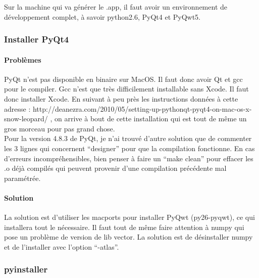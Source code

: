 \documentclass[12pt,a4paper]{article}
\begin{document}
        Sur la machine qui va g\'en\'erer le .app, il faut avoir un
        environnement de d\'eveloppement complet, à savoir python2.6, PyQt4 et
        PyQwt5.

        \subsubsection{Installer PyQt4}

        \paragraph{Problèmes}

        PyQt n'est pas disponible en binaire sur MacOS. Il faut donc avoir Qt et
        gcc pour le compiler.  Gcc n'est que très difficilement installable sans
        Xcode. Il faut donc installer Xcode.  En suivant à peu près les
        instructions données à cette adresse : \newline
        http://deanezra.com/2010/05/setting-up-pythonqt-pyqt4-on-mac-os-x-snow-leopard/\newline
        , on arrive à bout de cette installation qui est tout de même un gros
        morceau pour pas grand chose.\\
    
        Pour la version 4.8.3 de PyQt, je n'ai trouvé d'autre solution que de
        commenter les 3 lignes qui concernent ``designer'' pour que la
        compilation fonctionne. En cas d'erreurs incompréhensibles, bien penser
        à faire un ``make clean'' pour effacer les .o déjà compilés qui peuvent
        provenir d'une compilation précédente mal paramétrée.

        \paragraph{Solution}

        La solution est d'utiliser les macports pour installer PyQwt
        (py26-pyqwt), ce qui installera tout le n\'ecessaire. Il faut tout de
        même faire attention à numpy qui pose un problème de version de lib
        vector. La solution est de d\'esinstaller numpy et de l'installer avec
        l'option ``-atlas''. 
        
        \subsubsection{pyinstaller}
\end{document}
